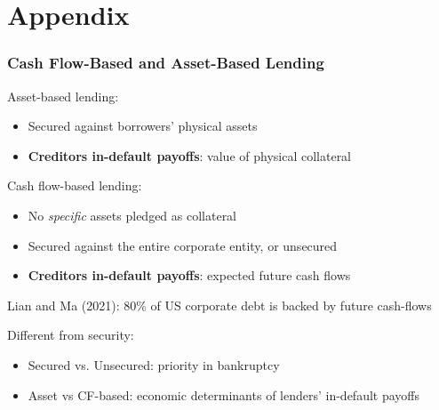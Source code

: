 \documentclass[aspectratio=169,xcolor=table]{beamer}
\begin{document}
\appendix
\section{Appendix}


\begin{frame}[label = LandM] \frametitle{Cash Flow-Based and Asset-Based Lending \hfill \hyperlink{motivation1}{}}

Asset-based lending:
\begin{itemize} \small
\item Secured against borrowers' physical  assets
\item \textbf{Creditors in-default payoffs}: value of physical collateral
\end{itemize} \normalsize 
Cash flow-based lending:
\begin{itemize} \small
\item No \textit{specific} assets pledged as collateral
\item Secured against the entire corporate entity, or unsecured
\item \textbf{Creditors in-default payoffs}: expected future cash flows
\end{itemize} \normalsize
Lian and Ma (2021): 80\% of US corporate debt is backed by future cash-flows \vspace{3mm}

Different from security: 
\begin{itemize} \small
    \item Secured vs. Unsecured: priority in bankruptcy
        \item Asset vs CF-based: economic determinants of lenders' in-default payoffs
\end{itemize} \normalsize

\end{frame}
\end{document}
